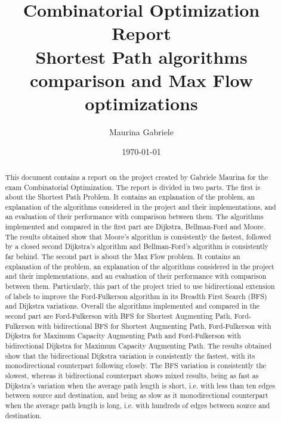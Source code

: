\documentclass{article}
\title{Combinatorial Optimization Report\\[1ex]
\large Shortest Path algorithms comparison and Max Flow optimizations}
\author{Maurina Gabriele}
\date{\today}
\begin{document}
\begin{titlepage}
\maketitle
\end{titlepage}

\begin{abstract}
This document contains a report on the project created by Gabriele Maurina for the exam Combinatorial Optimization.
The report is divided in two parts. The first is about the Shortest Path Problem. It contains an explanation of the problem,
an explanation of the algorithms considered in the project and their implementations, and an evaluation of their performance
with comparison between them. The algorithms implemented and compared in the first part are Dijkstra, Bellman-Ford and Moore.
The results obtained show that Moore's algorithm is consistently the fastest, followed by a closed second Dijkstra's algorithm
and Bellman-Ford's algorithm is consistently far behind.
The second part is about the Max Flow problem. It contains an explanation of the problem, an explanation of the algorithms considered in the project and
their implementations, and an evaluation of their performance with comparison between them. Particularly, this part of the project tried to
use bidirectional extension of labels to improve the Ford-Fulkerson algorithm in its Breadth First Search (BFS) and Dijkstra variations. Overall the algorithms implemented
and compared in the second part are Ford-Fulkerson with BFS for Shortest Augmenting Path, Ford-Fulkerson with bidirectional BFS for Shortest Augmenting Path,
Ford-Fulkerson with Dijkstra for Maximum Capacity Augmenting Path and Ford-Fulkerson with bidirectional Dijkstra for Maximum Capacity Augmenting Path.
The results obtained show that the bidirectional Dijkstra variation is consistently the fastest, with its monodirectional counterpart following closely.
The BFS variation is consistently the slowest, whereas it bidirectional counterpart shows mixed results, being as fast as Dijkstra's variation
when the average path length is short, i.e. with less than ten edges between source and destination, and being as slow as it monodirectional
counterpart when the average path length is long, i.e. with hundreds of edges between source and destination.
\end{abstract}

\tableofcontents



\end{document}

